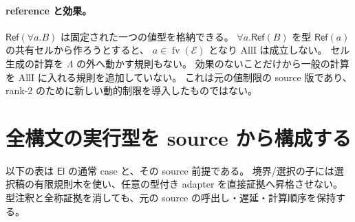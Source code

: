 \documentclass[11pt,a4paper]{article}
\newcommand{\El}{\mathsf{El}}
\newcommand{\fv}{\operatorname{fv}}
\begin{document}
\paragraph{reference と効果。}
\(\mathsf{Ref}(\forall a.B)\) は固定された一つの値型を格納できる。
\(\forall a.\mathsf{Ref}(B)\) を型 \(\mathsf{Ref}(a)\) の共有セルから作ろうとすると、
\(a\in\fv(\mathcal E)\) となり AllI は成立しない。
セル生成の計算を \(\Lambda\) の外へ動かす規則もない。
効果のないことだけから一般の計算を AllI に入れる規則を追加していない。
これは元の値制限の source 版であり、rank-2 のために新しい動的制限を導入したものではない。

\section{全構文の実行型を source から構成する}
\label{sec:all-source}

以下の表は \(\El\) の通常 case と、その source 前提である。
境界/選択の子には選択稿の有限規則木を使い、任意の型付き adapter を直接証拠へ昇格させない。
型注釈と全称証拠を消しても、元の source の呼出し・遅延・計算順序を保持する。
\end{document}
